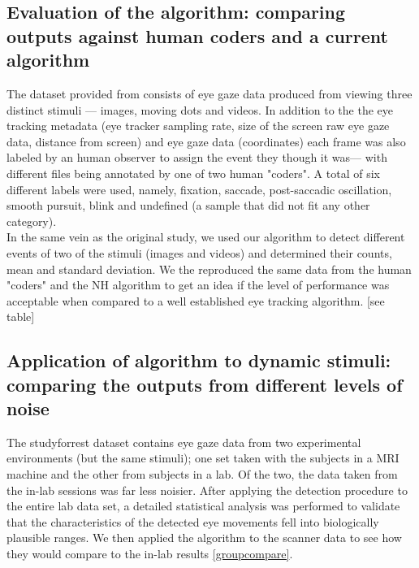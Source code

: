 \documentclass[10pt,a4paper]{extarticle}
\begin{document}
\subsection*{Evaluation of the algorithm: comparing outputs against human coders and a current algorithm}

The dataset provided from \citet{Andersson2017} consists of eye gaze data produced from viewing three distinct stimuli --- images, moving dots and videos. In addition to the the eye tracking metadata (eye tracker sampling rate, size of the screen raw eye gaze data, distance from screen) and eye gaze data (coordinates) each frame was also labeled by an human observer to assign the event they though it was--- with different files being annotated by one of two human "coders". A total of six different labels were used, namely, fixation, saccade, post-saccadic oscillation, smooth pursuit, blink and undefined (a sample that did not fit any other category). \\

In the same vein as the original study, we used our algorithm to detect different events of two of the stimuli (images and videos) and determined their counts, mean and standard deviation. We the reproduced the same data from the human "coders" and the NH algorithm \citep{Nystrom2010AnData} to get an idea if the level of performance was acceptable when compared to a well established eye tracking algorithm. [see table]  





\subsection*{Application of algorithm to dynamic stimuli: comparing the outputs from different levels of noise}
The studyforrest dataset contains eye gaze data from two experimental environments (but the same stimuli); one set taken with the subjects in a MRI machine and the other from subjects in a lab. Of the two, the data taken from the in-lab sessions was far less noisier. After applying the detection procedure to the entire lab data set, a detailed statistical analysis was performed to validate that the characteristics of the detected eye movements fell into biologically plausible ranges. We then applied the algorithm to the scanner data to see how they would compare to the in-lab results \ref{groupcompare}. 
\end{document}
